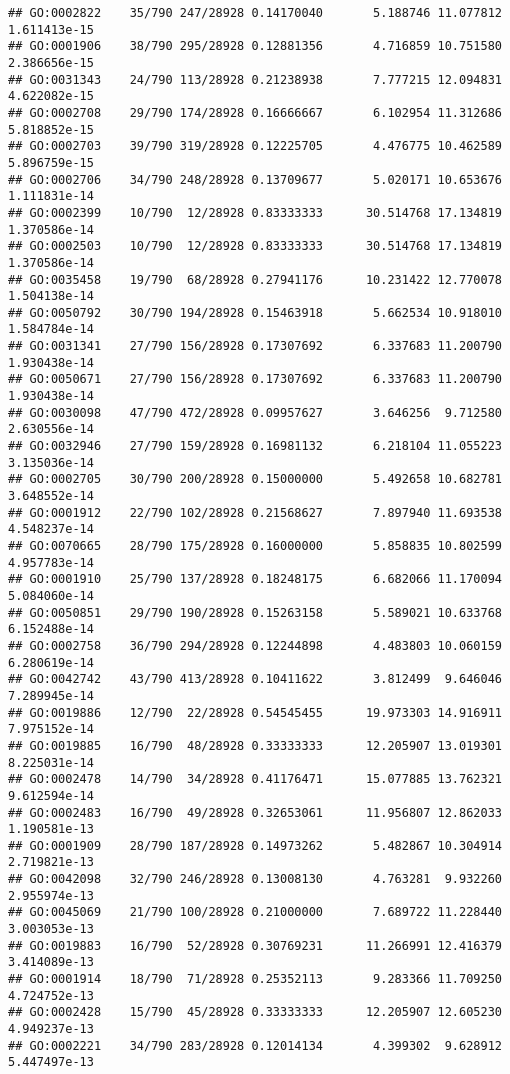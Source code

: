 \documentclass[
]{article}
\begin{document}
\begin{verbatim}
## GO:0002822    35/790 247/28928 0.14170040       5.188746 11.077812 1.611413e-15
## GO:0001906    38/790 295/28928 0.12881356       4.716859 10.751580 2.386656e-15
## GO:0031343    24/790 113/28928 0.21238938       7.777215 12.094831 4.622082e-15
## GO:0002708    29/790 174/28928 0.16666667       6.102954 11.312686 5.818852e-15
## GO:0002703    39/790 319/28928 0.12225705       4.476775 10.462589 5.896759e-15
## GO:0002706    34/790 248/28928 0.13709677       5.020171 10.653676 1.111831e-14
## GO:0002399    10/790  12/28928 0.83333333      30.514768 17.134819 1.370586e-14
## GO:0002503    10/790  12/28928 0.83333333      30.514768 17.134819 1.370586e-14
## GO:0035458    19/790  68/28928 0.27941176      10.231422 12.770078 1.504138e-14
## GO:0050792    30/790 194/28928 0.15463918       5.662534 10.918010 1.584784e-14
## GO:0031341    27/790 156/28928 0.17307692       6.337683 11.200790 1.930438e-14
## GO:0050671    27/790 156/28928 0.17307692       6.337683 11.200790 1.930438e-14
## GO:0030098    47/790 472/28928 0.09957627       3.646256  9.712580 2.630556e-14
## GO:0032946    27/790 159/28928 0.16981132       6.218104 11.055223 3.135036e-14
## GO:0002705    30/790 200/28928 0.15000000       5.492658 10.682781 3.648552e-14
## GO:0001912    22/790 102/28928 0.21568627       7.897940 11.693538 4.548237e-14
## GO:0070665    28/790 175/28928 0.16000000       5.858835 10.802599 4.957783e-14
## GO:0001910    25/790 137/28928 0.18248175       6.682066 11.170094 5.084060e-14
## GO:0050851    29/790 190/28928 0.15263158       5.589021 10.633768 6.152488e-14
## GO:0002758    36/790 294/28928 0.12244898       4.483803 10.060159 6.280619e-14
## GO:0042742    43/790 413/28928 0.10411622       3.812499  9.646046 7.289945e-14
## GO:0019886    12/790  22/28928 0.54545455      19.973303 14.916911 7.975152e-14
## GO:0019885    16/790  48/28928 0.33333333      12.205907 13.019301 8.225031e-14
## GO:0002478    14/790  34/28928 0.41176471      15.077885 13.762321 9.612594e-14
## GO:0002483    16/790  49/28928 0.32653061      11.956807 12.862033 1.190581e-13
## GO:0001909    28/790 187/28928 0.14973262       5.482867 10.304914 2.719821e-13
## GO:0042098    32/790 246/28928 0.13008130       4.763281  9.932260 2.955974e-13
## GO:0045069    21/790 100/28928 0.21000000       7.689722 11.228440 3.003053e-13
## GO:0019883    16/790  52/28928 0.30769231      11.266991 12.416379 3.414089e-13
## GO:0001914    18/790  71/28928 0.25352113       9.283366 11.709250 4.724752e-13
## GO:0002428    15/790  45/28928 0.33333333      12.205907 12.605230 4.949237e-13
## GO:0002221    34/790 283/28928 0.12014134       4.399302  9.628912 5.447497e-13

\end{verbatim}
\end{document}
